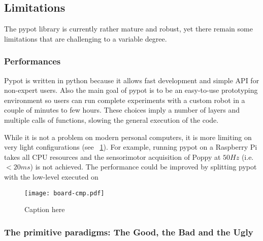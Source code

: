 \subsection{Limitations} %

The pypot library is currently rather mature and robust, yet there remain some limitations that are challenging to a variable degree.

\subsubsection{Performances}

Pypot is written in python because it allows fast development and simple API for non-expert users. Also the main goal of pypot is to be an easy-to-use prototyping environment so users can run complete experiments with a custom robot in a couple of minutes to few hours. These choices imply a number of layers and multiple calls of functions, slowing the general execution of the code.

While it is not a problem on modern personal computers, it is more limiting on very light configurations (see \figurename~\ref{fig:pypot-board-comparaison}). For example, running pypot on a Raspberry Pi takes all CPU resources and the sensorimotor acquisition of Poppy at $50Hz$ (i.e. $<20ms$) is not achieved.
The performance could be improved by splitting pypot with the low-level executed on

\begin{figure}[tb]
    \begin{center}
        \texttt{[image: board-cmp.pdf]}
    \end{center}
    \caption{Caption here}
    \label{fig:pypot-board-comparaison}
\end{figure}

\begin{figure}[tb]
\centering
    \hfil
    \caption{}
    \label{fig:pypot-run}
\end{figure}



\subsubsection{The primitive paradigms: The Good, the Bad and the Ugly}

